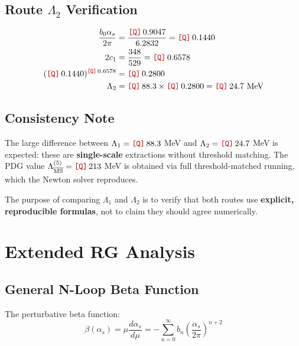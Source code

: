 \documentclass[11pt,a4paper]{article}
\newcommand{\Qnum}[1]{\textcolor{red!70!black}{\texttt{[Q]}}\,#1}
\theoremstyle{definition}
\begin{document}
\subsection{Route $\Lambda_2$ Verification}
\label{subsec:app-lambda2-verify}

\begin{quarantinebox}
\begin{align}
\label{eq:app-num-6}
\frac{b_0\alpha_s}{2\pi} &= \frac{\Qnum{0.9047}}{6.2832} = \Qnum{0.1440} \\
\label{eq:app-num-7}
2c_1 &= \frac{348}{529} = \Qnum{0.6578} \\
\label{eq:app-num-8}
(\Qnum{0.1440})^{\Qnum{0.6578}} &= \Qnum{0.2800} \\
\label{eq:app-num-9}
\Lambda_2 &= \Qnum{88.3} \times \Qnum{0.2800} = \Qnum{24.7} \text{ MeV}
\end{align}
\end{quarantinebox}

\subsection{Consistency Note}
\label{subsec:app-consistency-note}

The large difference between $\Lambda_1 = \Qnum{88.3}$ MeV and $\Lambda_2 = \Qnum{24.7}$ MeV
is expected: these are \textbf{single-scale} extractions without threshold matching.
The PDG value $\Lambda_{\overline{\text{MS}}}^{(5)} = \Qnum{213}$ MeV is obtained
via full threshold-matched running, which the Newton solver reproduces.

The purpose of comparing $\Lambda_1$ and $\Lambda_2$ is to verify that both routes
use \textbf{explicit, reproducible formulas}, not to claim they should agree numerically.

\section{Extended RG Analysis}
\label{app:rg-extended}

\subsection{General N-Loop Beta Function}
\label{subsec:nloop-beta}

The perturbative beta function:
\begin{equation}
\label{eq:app-beta-general}
\beta(\alpha_s) = \mu\frac{d\alpha_s}{d\mu}
  = -\sum_{n=0}^{\infty} b_n \left(\frac{\alpha_s}{2\pi}\right)^{n+2}
\end{equation}
\end{document}

